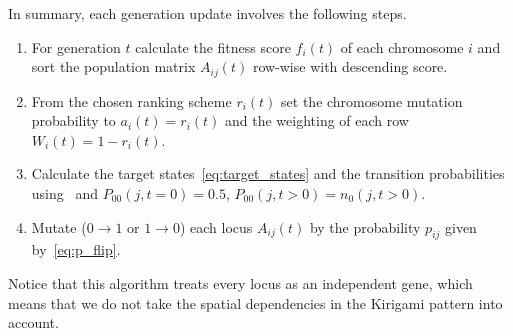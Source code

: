 In summary, each generation update involves the following steps.
\begin{enumerate}
  \item For generation $t$ calculate the fitness score $f_i(t)$ of each chromosome $i$ and sort the population matrix $A_{ij}(t)$ row-wise with descending score. 
  \item From the chosen ranking scheme $r_i(t)$ set the chromosome mutation probability to $a_i(t) = r_i(t)$ and the weighting of each row $W_i(t) = 1 - r_i(t)$.
  \item Calculate the target states~\cref{eq:target_states} and the transition probabilities using~ and $P_{00}(j, t = 0) = 0.5$, $P_{00}(j,t>0) = n_0(j,t>0)$.
  \item Mutate ($0\to1$ or $1\to0$) each locus $A_{ij}(t)$ by the probability $p_{ij}$ given by~\cref{eq:p_flip}.
\end{enumerate}
Notice that this algorithm treats every locus as an independent gene, which means that we do not take the spatial dependencies in the Kirigami pattern into account.


